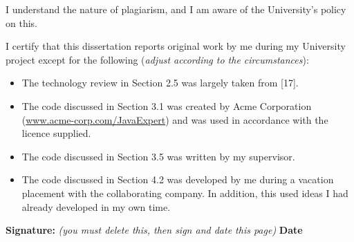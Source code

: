 
I understand the nature of plagiarism, and I am aware of the University's 
policy on this.

I certify that this dissertation reports original work by me during my 
University project except for the following (\textit{adjust according to the 
circumstances}):
\begin{itemize}
    \item The technology review in Section 2.5 was largely taken from [17].
    \item The code discussed in Section 3.1 was created by Acme Corporation 
    (\url{www.acme-corp.com/JavaExpert}) and was used in accordance with the 
    licence supplied.
    \item The code discussed in Section 3.5 was written by my supervisor.
    \item The code discussed in Section 4.2 was developed by me during a 
    vacation placement with the collaborating company. In addition, this used 
    ideas I had already developed in my own time.
\end{itemize}


\textbf{Signature:} %
\textit{(you must delete this, then sign and date this page)} %
 \textbf{Date}

